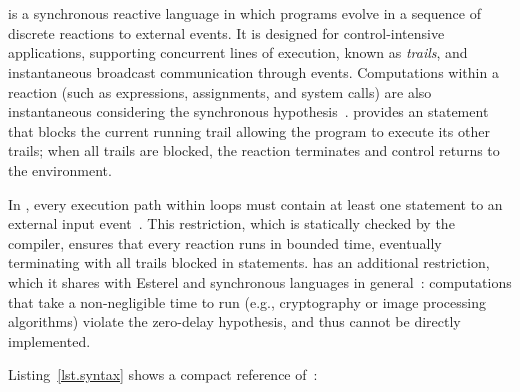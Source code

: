\section{\CEU}
\label{sec.ceu}

\CEU is a synchronous reactive language in which programs evolve in a sequence
of discrete reactions to external events.
%
It is designed for control-intensive applications, supporting concurrent lines
of execution, known as \emph{trails}, and instantaneous broadcast communication
through events.
%
Computations within a reaction (such as expressions, assignments, and
system calls) are also instantaneous considering the synchronous
hypothesis~\cite{rp.hypothesis}.
%
%
\CEU provides an  statement that blocks the current running trail
allowing the program to execute its other trails; when all trails are blocked,
the reaction terminates and control returns to the environment.

In \CEU, every execution path within loops must contain at least one
 statement to an external input
event~\cite{ceu.sensys13,esterel.primer}.
%
This restriction, which is statically checked by the compiler, ensures that
every reaction runs in bounded time, eventually terminating with all trails
blocked in  statements.
%
\CEU has an additional restriction, which it shares with Esterel and
synchronous languages in general~\cite{esterel.preemption}: computations that
take a non-negligible time to run (e.g., cryptography or image processing
algorithms) violate the zero-delay hypothesis, and thus cannot be directly
implemented.

Listing~\ref{lst.syntax} shows a compact reference of~\CEU:

